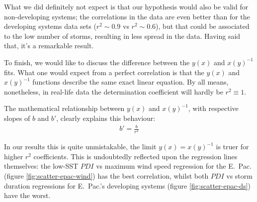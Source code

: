 What we did definitely not expect is that our hypothesis would also be valid for non-developing systems; the correlations in the data are even better than for the developing systems data sets ($r^{2} \sim 0.9$ vs $r^{2} \sim 0.6$), but that could be associated to the low number of storms, resulting in less spread in the data. Having said that, it's a remarkable result.

\bigskip
To finish, we would like to discuss the difference between the $y(x)$ and $x(y)^{-1}$ fits. What one would expect from a perfect correlation is that the $y(x)$ and $x(y)^{-1}$ functions describe the same exact linear equation. By all means, nonetheless, in real-life data the determination coefficient will hardly be $r^{2} \equiv 1$.

The mathematical relationship between $y(x)$ and $x(y)^{-1}$, with respective slopes of $b$ and $b'$, clearly explains this behaviour:
\begin{align}
	b' = \frac{b}{r^{2}}
\end{align}

In our results this is quite unmistakable, the limit $y(x) = x(y)^{-1}$ is truer for higher $r^{2}$ coefficients. This is undoubtedly reflected upon the regression lines themselves: the low-SST $PDI$ vs maximum wind speed regression for the E.~Pac. (figure \ref{fig:scatter-epac-wind}) has the best correlation, whilst both $PDI$ vs storm duration regressions for E.~Pac.'s developing systems (figure \ref{fig:scatter-epac-ds}) have the worst.

